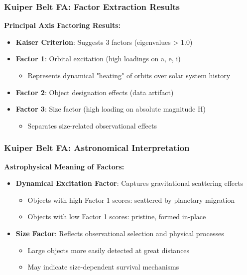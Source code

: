 \documentclass[aspectratio=169]{beamer}
\begin{document}
\begin{frame}
    \frametitle{Kuiper Belt FA: Factor Extraction Results}
    \textbf{Principal Axis Factoring Results:}
    \begin{itemize}
        \item \textbf{Kaiser Criterion}: Suggests 3 factors (eigenvalues > 1.0) \pause
        \item \textbf{Factor 1}: Orbital excitation (high loadings on a, e, i) \pause
              \begin{itemize}
                  \item Represents dynamical "heating" of orbits over solar system history \pause
              \end{itemize}
        \item \textbf{Factor 2}: Object designation effects (data artifact) \pause
        \item \textbf{Factor 3}: Size factor (high loading on absolute magnitude H) \pause
              \begin{itemize}
                  \item Separates size-related observational effects \pause
              \end{itemize}
    \end{itemize}
\end{frame}

\begin{frame}
    \frametitle{Kuiper Belt FA: Astronomical Interpretation}
    \textbf{Astrophysical Meaning of Factors:}
    \begin{itemize}
        \item \textbf{Dynamical Excitation Factor}: Captures gravitational scattering effects \pause
              \begin{itemize}
                  \item Objects with high Factor 1 scores: scattered by planetary migration \pause
                  \item Objects with low Factor 1 scores: pristine, formed in-place \pause
              \end{itemize}
        \item \textbf{Size Factor}: Reflects observational selection and physical processes \pause
              \begin{itemize}
                  \item Large objects more easily detected at great distances \pause
                  \item May indicate size-dependent survival mechanisms \pause
              \end{itemize}
    \end{itemize}
\end{frame}
\end{document}
